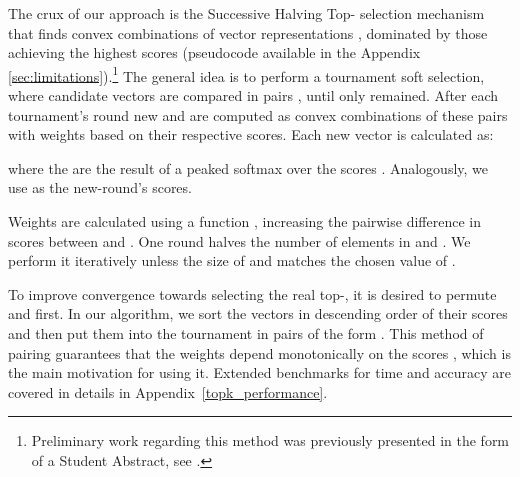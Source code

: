 \documentclass{article}
\begin{document}
The crux of our approach is the Successive Halving Top- selection mechanism
that finds  convex combinations of vector representations , dominated by those achieving the highest scores  (pseudocode available in the Appendix \ref{sec:limitations}).\footnote{Preliminary work regarding this method was previously presented in the form of a Student Abstract, see \citet{pietruszka2020successive}.} The general idea is to perform a tournament soft selection, where candidate vectors are compared in pairs , until only  remained. After each tournament's round new  and  are computed as convex combinations of these pairs with weights based on their respective scores. Each new vector is calculated as:

where the  are the result of a peaked softmax over the scores .
Analogously, we use  as the new-round's scores.


Weights are calculated using a  function \citep{goyal-etal-2017-differentiable}, increasing the pairwise difference in scores between  and . 
One round halves the number of elements in  and . We perform it iteratively unless the size of  and  matches the chosen value of . 

To improve convergence towards selecting the real top-, it is desired to permute  and  first. In our algorithm, we sort the vectors  in descending order of their scores  and then put them into the tournament in pairs of the form . This method of pairing guarantees that the weights  depend monotonically on the scores , which is the main motivation for using it. Extended benchmarks for time and accuracy are covered in details in  Appendix~\ref{topk_performance}.
\end{document}
